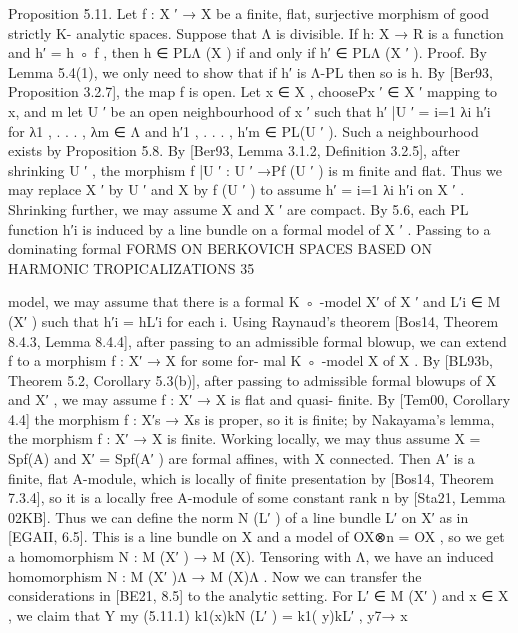 \documentclass[
  10pt,
]{article}
\newenvironment{Shaded}{}{}
\newcommand{\NormalTok}[1]{#1}
\begin{document}
\begin{Shaded}
\begin{Highlighting}[]
\NormalTok{Proposition 5.11. Let f : X ′ → X be a finite, flat, surjective morphism of good strictly K{-}}
\NormalTok{analytic spaces. Suppose that Λ is divisible. If h: X → R is a function and h′ = h ◦ f , then}
\NormalTok{h ∈ PLΛ (X ) if and only if h′ ∈ PLΛ (X ′ ).}
\NormalTok{Proof. By Lemma 5.4(1), we only need to show that if h′ is Λ{-}PL then so is h. By [Ber93,}
\NormalTok{Proposition 3.2.7], the map f is open. Let x ∈ X , choosePx ′ ∈ X ′ mapping to x, and}
\NormalTok{                                                                  m}
\NormalTok{let U ′ be an open neighbourhood of x ′ such that h′ |U ′ = i=1 λi h′i for λ1 , . . . , λm ∈ Λ}
\NormalTok{and h′1 , . . . , h′m ∈ PL(U ′ ). Such a neighbourhood exists by Proposition 5.8. By [Ber93,}
\NormalTok{Lemma 3.1.2, Definition 3.2.5], after shrinking U ′ , the morphism f |U ′ : U ′ →Pf (U ′ ) is}
\NormalTok{                                                                                        m}
\NormalTok{finite and flat. Thus we may replace X ′ by U ′ and X by f (U ′ ) to assume h′ = i=1 λi h′i}
\NormalTok{on X ′ . Shrinking further, we may assume X and X ′ are compact. By 5.6, each PL function}
\NormalTok{h′i is induced by a line bundle on a formal model of X ′ . Passing to a dominating formal}
\NormalTok{                FORMS ON BERKOVICH SPACES BASED ON HARMONIC TROPICALIZATIONS                                         35}

\NormalTok{model, we may assume that there is a formal K ◦ {-}model X′ of X ′ and L′i ∈ M (X′ ) such}
\NormalTok{that h′i = hL′i for each i.}
\NormalTok{   Using Raynaud’s theorem [Bos14, Theorem 8.4.3, Lemma 8.4.4], after passing to an}
\NormalTok{admissible formal blowup, we can extend f to a morphism f : X′ → X for some for{-}}
\NormalTok{mal K ◦ {-}model X of X . By [BL93b, Theorem 5.2, Corollary 5.3(b)], after passing to}
\NormalTok{admissible formal blowups of X and X′ , we may assume f : X′ → X is flat and quasi{-}}
\NormalTok{finite. By [Tem00, Corollary 4.4] the morphism f : X′s → Xs is proper, so it is finite; by}
\NormalTok{Nakayama’s lemma, the morphism f : X′ → X is finite. Working locally, we may thus}
\NormalTok{assume X = Spf(A) and X′ = Spf(A′ ) are formal affines, with X connected. Then A′ is a}
\NormalTok{finite, flat A{-}module, which is locally of finite presentation by [Bos14, Theorem 7.3.4],}
\NormalTok{so it is a locally free A{-}module of some constant rank n by [Sta21, Lemma 02KB]. Thus}
\NormalTok{we can define the norm N (L′ ) of a line bundle L′ on X′ as in [EGAII, 6.5]. This is a line}
\NormalTok{bundle on X and a model of OX⊗n = OX , so we get a homomorphism N : M (X′ ) → M (X).}
\NormalTok{Tensoring with Λ, we have an induced homomorphism N : M (X′ )Λ → M (X)Λ .}
\NormalTok{   Now we can transfer the considerations in [BE21, 8.5] to the analytic setting. For}
\NormalTok{L′ ∈ M (X′ ) and x ∈ X , we claim that}
\NormalTok{                                                Y         my}
\NormalTok{(5.11.1)                        k1(x)kN (L′ ) =    k1( y)kL′ ,}
\NormalTok{                                                                 y7→ x}


\end{Highlighting}
\end{Shaded}
\end{document}
